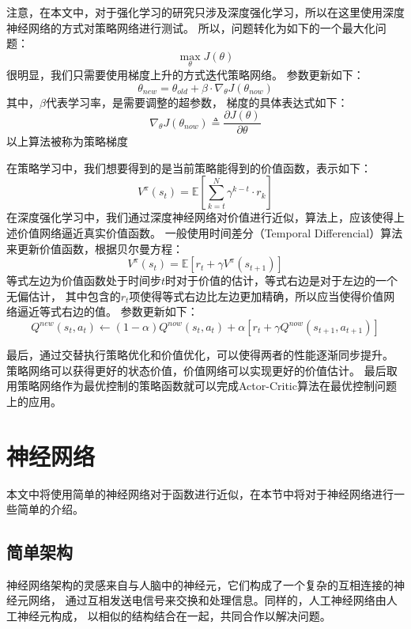 \documentclass[AutoFakeBold]{LZUThesis}
\begin{document}
注意，在本文中，对于强化学习的研究只涉及深度强化学习，所以在这里使用深度神经网络的方式对策略网络进行测试。
所以，问题转化为如下的一个最大化问题：
\begin{equation}
  \max_{\theta} J(\theta)
\end{equation}
很明显，我们只需要使用梯度上升的方式迭代策略网络。
参数更新如下：
\begin{equation}
  \theta_{new} = \theta_{old} + \beta \cdot \nabla_\theta J(\theta_{now})
\end{equation}
其中，$\beta$代表学习率，是需要调整的超参数，
梯度的具体表达式如下：
\begin{equation}
  \nabla_\theta J(\theta_{now}) \triangleq \frac{\partial J(\theta)}{\partial \theta}
\end{equation}
以上算法被称为策略梯度

在策略学习中，我们想要得到的是当前策略能得到的价值函数，表示如下：
\begin{equation}
  V^\pi(s_t) = \mathbb{E} \left[ \sum_{k = t}^{N}
  \gamma^{k - t} \cdot r_k \right]
\end{equation}
在深度强化学习中，我们通过深度神经网络对价值进行近似，算法上，应该使得上述价值网络逼近真实价值函数。
一般使用时间差分（Temporal Differencial）算法来更新价值函数，根据贝尔曼方程：
\begin{equation}
  V^{\pi}(s_t) = \mathbb{E} \left[ r_t + \gamma V^\pi(s_{t + 1}) \right]
\end{equation}
等式左边为价值函数处于时间步$t$时对于价值的估计，等式右边是对于左边的一个无偏估计，
其中包含的$r_t$项使得等式右边比左边更加精确，所以应当使得价值网络逼近等式右边的值。
参数更新如下：
\begin{equation}
  Q^{new}(s_t, a_t) \leftarrow (1 - \alpha) Q^{now}(s_t, a_t) 
  + \alpha [ r_t + \gamma Q^{now}(s_{t + 1}, a_{t + 1}) ]
\end{equation}

最后，通过交替执行策略优化和价值优化，可以使得两者的性能逐渐同步提升。
策略网络可以获得更好的状态价值，价值网络可以实现更好的价值估计。
最后取用策略网络作为最优控制的策略函数就可以完成Actor-Critic算法在最优控制问题上的应用。

\section{神经网络}
本文中将使用简单的神经网络对于函数进行近似，在本节中将对于神经网络进行一些简单的介绍。
\subsection{简单架构}
神经网络架构的灵感来自与人脑中的神经元，它们构成了一个复杂的互相连接的神经元网络，
通过互相发送电信号来交换和处理信息。同样的，人工神经网络由人工神经元构成，
以相似的结构结合在一起，共同合作以解决问题。
\end{document}
